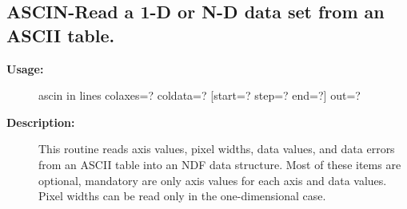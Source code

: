 \subsection{ASCIN-\label{ASCIN}Read a 1-D or N-D data set from an ASCII table.}
\begin{description}

\item [\textbf{Usage:}]

   ascin in lines colaxes=? coldata=? [start=? step=? end=?] out=?


\item [\textbf{Description:}]
   This routine reads axis values, pixel widths, data values, and
   data errors from an ASCII table into an NDF data structure.
   Most of these items are optional, mandatory are only
   axis values for each axis and data values. Pixel widths can be
   read only in the one-dimensional case.



\end{description}
